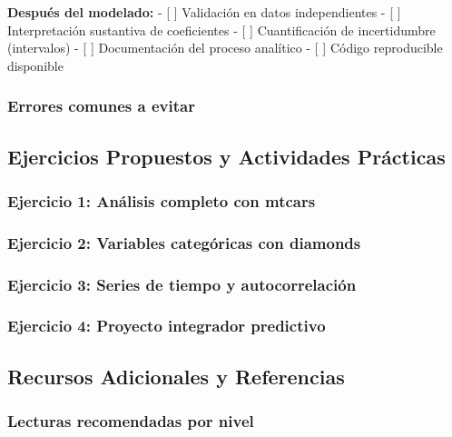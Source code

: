 \documentclass[
  oneside]{book}
\begin{document}
\textbf{Después del modelado:}
- {[} {]} Validación en datos independientes
- {[} {]} Interpretación sustantiva de coeficientes
- {[} {]} Cuantificación de incertidumbre (intervalos)
- {[} {]} Documentación del proceso analítico
- {[} {]} Código reproducible disponible

\subsubsection{Errores comunes a evitar}\label{errores-comunes-a-evitar}

\subsection{Ejercicios Propuestos y Actividades Prácticas}\label{ejercicios-propuestos-y-actividades-pruxe1cticas}

\subsubsection{Ejercicio 1: Análisis completo con mtcars}\label{ejercicio-1-anuxe1lisis-completo-con-mtcars}

\subsubsection{Ejercicio 2: Variables categóricas con diamonds}\label{ejercicio-2-variables-categuxf3ricas-con-diamonds}

\subsubsection{Ejercicio 3: Series de tiempo y autocorrelación}\label{ejercicio-3-series-de-tiempo-y-autocorrelaciuxf3n}

\subsubsection{Ejercicio 4: Proyecto integrador predictivo}\label{ejercicio-4-proyecto-integrador-predictivo}

\subsection{Recursos Adicionales y Referencias}\label{recursos-adicionales-y-referencias}

\subsubsection{Lecturas recomendadas por nivel}\label{lecturas-recomendadas-por-nivel}
\end{document}
